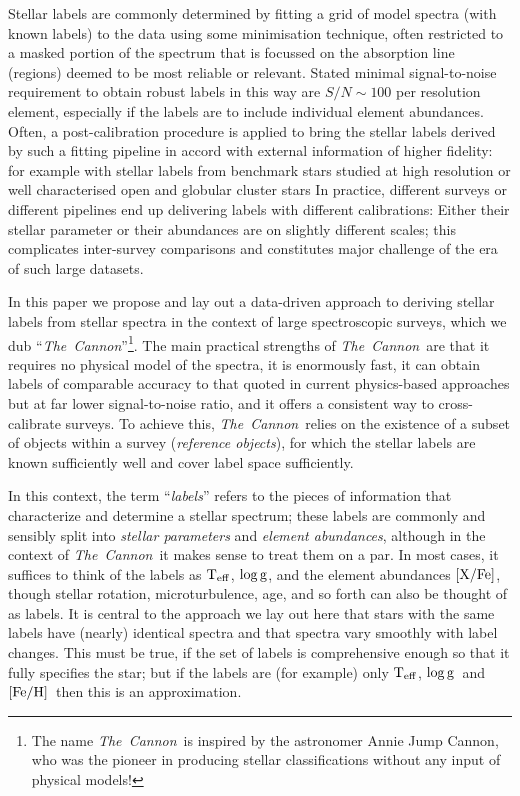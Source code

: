 \documentclass[12pt, preprint]{aastex}
\newcommand{\teff}{\mbox{$\rm T_{eff}$}}
\newcommand{\feh}{\mbox{$\rm [Fe/H]$}}
\newcommand{\xfe}{\mbox{$\rm [X/Fe]$}}
\newcommand{\logg}{\mbox{$\rm \log g$}}
\newcommand{\tc}{\textsl{The~Cannon}}
\begin{document}
Stellar labels are commonly determined by fitting a grid of model spectra (with known labels) to the data using some minimisation technique, often restricted to a masked portion of the spectrum that is focussed on the absorption line (regions) deemed to be most reliable or relevant. 
Stated minimal signal-to-noise requirement to obtain robust labels in this way are $S/N\sim 100$ per resolution element, especially if the labels are to include individual element abundances. 
Often, a post-calibration procedure is applied to bring the stellar labels derived by such a fitting pipeline in accord with external information of higher fidelity: for example with stellar labels from benchmark stars studied at high resolution or well characterised open and globular cluster stars \citep[e.g.,][]{Meszaros2013, Freeman2013}
In practice, different surveys or different pipelines end up delivering labels with different calibrations:
Either their stellar parameter or their abundances are on slightly different scales; this complicates
inter-survey comparisons and constitutes major challenge of the era of such large datasets. 

In this paper we propose and lay out a data-driven approach to deriving stellar labels from stellar spectra in the context of large spectroscopic surveys,
which we dub ``\tc''\footnote{The name \tc\ is inspired by the astronomer Annie Jump Cannon,
who was the pioneer in producing stellar classifications without any input of physical models!}.
The main practical strengths of \tc\ are that it requires no physical model of the spectra, it is enormously fast, it can obtain labels of comparable accuracy to that quoted in current physics-based approaches
 but at far lower signal-to-noise ratio, and it offers a consistent way to cross-calibrate surveys. 
To achieve this, \tc\ relies on the existence of a subset of objects within a survey
(\textit{reference objects}), for which the stellar labels are known sufficiently well and cover label space sufficiently.

In this context, the term ``\emph{labels}'' refers to the pieces of information
that characterize and determine a stellar spectrum; these labels are commonly and sensibly split into \emph{stellar parameters} and \emph{element abundances}, although in the context of \tc\ it makes sense to treat them on a par. 
In most cases, it suffices to think of the labels as \teff , \logg, and the element abundances \xfe, though stellar rotation, microturbulence, age, and so forth can also be thought of as labels.
It is central to the approach we lay out here that stars with the same labels have (nearly) identical spectra and that spectra vary smoothly with label changes. 
This must be true, if the set of labels is comprehensive enough so that it fully specifies the star; but if the labels are (for example) only \teff, \logg\ and \feh\ then this is an approximation.
\end{document}

